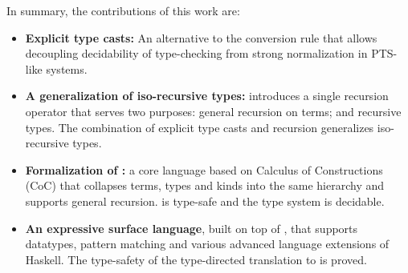 \begin{comment}
In particular
the treatment of type-level computation in \name shares similar ideas
with Haskell. Although Haskell's surface language provides a rich set
of mechanisms to do type-level computation~\cite{}, the core language
lacks fundamental mechanisms todo type-level computation. Type
equality in System $F_{C}$ is, like in \name, purely syntactic (modulo
alpha-conversion).
\end{comment}

\begin{comment}
 and there is no type-level
abstraction. In other words in Haskell, mechanisms such as type
classes and type families

Although it may seem that forcing each step of computation 
at the type-level to be explicit will prevent convinient use of 
type-level computation.

Point about the treatment of type-level computation in Haskell. Haskell's
core language has type applications, but no type-level lambda. Equality 
is syntactic modulo alpha-conversion. This design choice was rooted in the 
desire to support Hindley-Milner type-inference... 
\end{comment}

In summary, the contributions of this work are:

\begin{itemize}
\item {\bf Explicit type casts:} An alternative to the conversion rule
  that allows decoupling decidability of type-checking from strong
  normalization in PTS-like systems.

\item {\bf A generalization of iso-recursive types:} \name introduces 
  a single recursion operator that serves two purposes:
  general recursion on terms; and recursive types. The combination of
  explicit type casts and recursion generalizes iso-recursive types.

\item {\bf Formalization of \name:} a core
  language based on Calculus of Constructions (CoC) that collapses
  terms, types and kinds into the same hierarchy and supports general
  recursion. \name is type-safe and the type system is decidable.

\item {\bf An expressive surface language}, built on top of \name,
  that supports datatypes, pattern matching and various advanced
  language extensions of Haskell. The type-safety of the type-directed
  translation to \name is proved.
\end{itemize}



